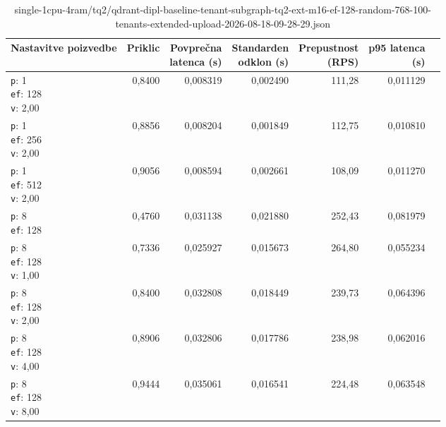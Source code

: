 \begin{table}[htbp]
  \centering
\small
  \caption{single-1cpu-4ram/tq2/qdrant-dipl-baseline-tenant-subgraph-tq2-ext-m16-ef-128-random-768-100-tenants-extended-upload-2026-08-18-09-28-29.json}
  \label{tab:single-1cpu-4ram:tq2:qdrant-dipl-baseline-tenant-subgraph-tq2-ext-m16-ef-128-random-768-100-tenants-extended-upload-2026-08-18-09-28-29.json}
  \begin{tabularx}{\textwidth}{Xrrrrrr}
    \toprule
    Nastavitve poizvedbe & Priklic & \makecell{Povprečna\\latenca (s)} & \makecell{Standarden\\odklon (s)} & \makecell{Prepustnost\\(RPS)} & \makecell{p95 latenca\\(s)}  \\
    \midrule
    \makecell{\texttt{p}: 1\\\texttt{ef}: 128\\\texttt{v}: 2,00} & 0,8400 & 0,008319 & 0,002490 & 111,28 & 0,011129 \\
    \makecell{\texttt{p}: 1\\\texttt{ef}: 256\\\texttt{v}: 2,00} & 0,8856 & 0,008204 & 0,001849 & 112,75 & 0,010810 \\
    \makecell{\texttt{p}: 1\\\texttt{ef}: 512\\\texttt{v}: 2,00} & 0,9056 & 0,008594 & 0,002661 & 108,09 & 0,011270 \\
    \makecell{\texttt{p}: 8\\\texttt{ef}: 128} & 0,4760 & 0,031138 & 0,021880 & 252,43 & 0,081979 \\
    \makecell{\texttt{p}: 8\\\texttt{ef}: 128\\\texttt{v}: 1,00} & 0,7336 & 0,025927 & 0,015673 & 264,80 & 0,055234 \\
    \makecell{\texttt{p}: 8\\\texttt{ef}: 128\\\texttt{v}: 2,00} & 0,8400 & 0,032808 & 0,018449 & 239,73 & 0,064396 \\
    \makecell{\texttt{p}: 8\\\texttt{ef}: 128\\\texttt{v}: 4,00} & 0,8906 & 0,032806 & 0,017786 & 238,98 & 0,062016 \\
    \makecell{\texttt{p}: 8\\\texttt{ef}: 128\\\texttt{v}: 8,00} & 0,9444 & 0,035061 & 0,016541 & 224,48 & 0,063548 \\

\end{tabularx}
\end{table}
